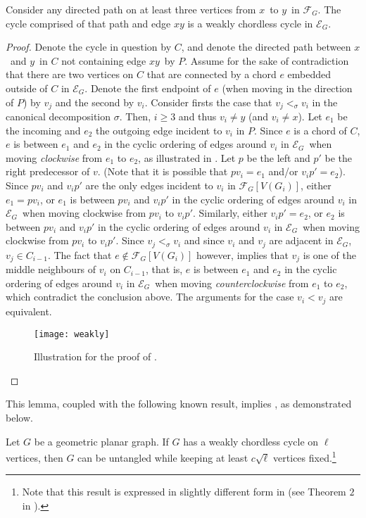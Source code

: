\documentclass[lotsofwhite,charterfonts, letter]{patmorin}
\newcommand{\Figure}[4][htb]{
\begin{figure}[#1]
  \vspace*{1ex}
  \begin{center}#3\end{center}
	\vspace*{-2ex}
	\caption{\figlabel{#2}#4}
\end{figure}}
\newcommand{\eg}{\ensuremath{\mathcal{E}_G}}
\newcommand{\fg}{\ensuremath{\mathcal{F}_G}}
\newcommand{\xx}{\ensuremath{x}}
\newcommand{\yy}{\ensuremath{y}}
\begin{document}
\begin{lem}
Consider any directed path on at least three vertices from \xx\ to \yy\ in \fg. The cycle comprised of that path and edge $\xx\yy$ is a weakly chordless cycle in \eg.
\end{lem}
\begin{proof}
Denote the cycle in question by $C$, and denote the directed path
between \xx\ and \yy\ in $C$ not containing edge \xx\yy\ by $P$.
Assume for the sake of contradiction that there are two vertices on
$C$ that are connected by a chord $e$ embedded outside of $C$ in \eg.
Denote the first endpoint of $e$ (when moving in the direction of $P$)
by $v_j$ and the second by $v_i$.  Consider firsts the case that $v_j<_\sigma v_i$ in the canonical decomposition $\sigma$. Then, $i\geq 3$ and thus $v_i\ne \yy$ (and $v_i\ne \xx$). Let $e_1$ be the incoming and $e_2$ the outgoing edge incident to $v_i$ in $P$. Since $e$ is a chord of $C$, $e$ is between $e_1$ and $e_2$ in the cyclic ordering of edges around $v_i$ in \eg\ when moving \emph{clockwise} from $e_1$ to $e_2$, as illustrated in . Let $p$ be the left and $p'$ be the right predecessor of $v$.
 (Note that it is possible that $pv_i=e_1$ and/or $v_ip'=e_2$). Since $pv_i$ and $v_ip'$ are the only edges incident to $v_i$ in $\fg[V(G_i)]$, either $e_1=pv_i$, or $e_1$ is between $pv_i$ and $v_ip'$ in the cyclic ordering of edges around $v_i$ in \eg\ when moving clockwise from $pv_i$ to $v_ip'$. Similarly, either $v_ip'=e_2$, or $e_2$ is between $pv_i$ and $v_ip'$ in the cyclic ordering of edges around $v_i$ in \eg\  when moving clockwise from $pv_i$ to $v_ip'$. Since $v_j<_\sigma v_i$ and since $v_i$ and $v_j$ are adjacent in \eg, $v_j\in C_{i-1}$. The fact that $e\not\in \fg[V(G_i)]$ however, implies that $v_j$ is one of the middle neighbours of $v_i$ on $C_{i-1}$, that is,  $e$ is between $e_1$ and $e_2$ in the cyclic ordering of edges around $v_i$ in \eg\ when moving \emph{counterclockwise} from $e_1$ to $e_2$, which contradict the conclusion above. The arguments for the case $v_i<v_j$ are equivalent.
%
\Figure{weakly}{\texttt{[image: weakly]}                
}{Illustration for the proof of \lemref{weakly}.}
%
\end{proof}

This lemma, coupled with the following known result, implies , as demonstrated below.

\begin{thm}\cite{alex}
Let $G$ be a geometric planar graph. If $G$ has a weakly chordless cycle on $\ell$ vertices, then $G$ can be untangled while keeping at least $c\sqrt{\ell}$ vertices fixed.\footnote{Note that this result is expressed in slightly different form in \cite{alex} (see Theorem $2$ in \cite{alex}).} 
\end{thm}
\end{document}
